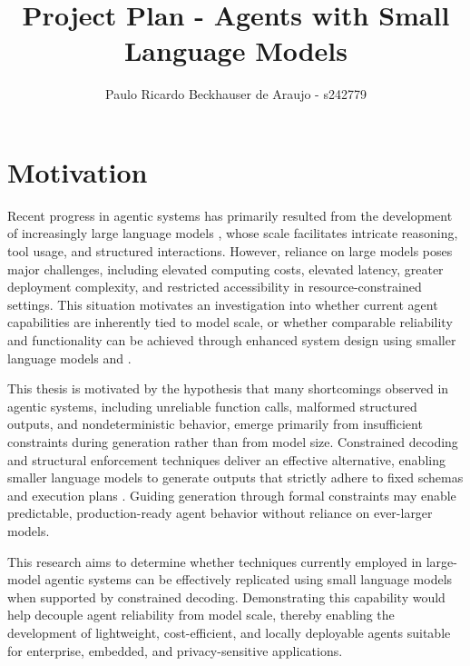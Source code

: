 \documentclass{article}
\title{Project Plan - Agents with Small Language Models}
\author{Paulo Ricardo Beckhauser de Araujo - s242779}
\begin{document}
\maketitle

\section*{Motivation}

Recent progress in agentic systems has primarily resulted from the
development of increasingly large language models \cite{Andreas2022Language}, whose scale facilitates
intricate reasoning, tool usage, and structured interactions.
However, reliance on large models poses major challenges, including elevated
computing costs, elevated latency, greater deployment complexity, and
restricted accessibility in resource-constrained settings.
This situation motivates an investigation into whether current agent
capabilities are inherently tied to model scale, or whether comparable
reliability and functionality can be achieved through enhanced system design
using smaller language models \cite{Zhang2025The} and \cite{Belcák2025Small}.

This thesis is motivated by the hypothesis that many shortcomings observed in
agentic systems, including unreliable function calls, malformed structured
outputs, and nondeterministic behavior, emerge primarily from insufficient
constraints during generation rather than from model size.
Constrained decoding and structural enforcement techniques deliver an
effective alternative, enabling smaller language models to generate outputs
that strictly adhere to fixed schemas and execution plans \cite{Beurer-Kellner2024Guiding}.
Guiding generation through formal constraints may enable predictable,
production-ready agent behavior without reliance on ever-larger models.

This research aims to determine whether techniques currently employed in
large-model agentic systems can be effectively replicated using small
language models when supported by constrained decoding.
Demonstrating this capability would help decouple agent reliability from
model scale, thereby enabling the development of lightweight, cost-efficient,
and locally deployable agents suitable for enterprise, embedded, and
privacy-sensitive applications.
\end{document}
